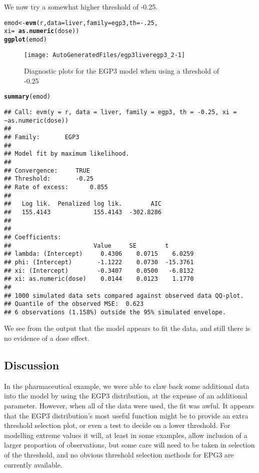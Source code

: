 \documentclass[a4paper]{article}\usepackage[]{graphicx}\usepackage[]{color}
\makeatletter
\def\maxwidth{ %
  \ifdim\Gin@nat@width>\linewidth
    \linewidth
  \else
    \Gin@nat@width
  \fi
}
\newcommand{\hlnum}[1]{\textcolor[rgb]{0.686,0.059,0.569}{#1}}%
\newcommand{\hlopt}[1]{\textcolor[rgb]{0,0,0}{#1}}%
\newcommand{\hlstd}[1]{\textcolor[rgb]{0.345,0.345,0.345}{#1}}%
\newcommand{\hlkwb}[1]{\textcolor[rgb]{0.69,0.353,0.396}{#1}}%
\newcommand{\hlkwc}[1]{\textcolor[rgb]{0.333,0.667,0.333}{#1}}%
\newcommand{\hlkwd}[1]{\textcolor[rgb]{0.737,0.353,0.396}{\textbf{#1}}}%
\newenvironment{kframe}{%
 \def\at@end@of@kframe{}%
 \ifinner\ifhmode%
  \def\at@end@of@kframe{\end{minipage}}%
  \begin{minipage}{\columnwidth}%
 \fi\fi%
 \def\FrameCommand##1{\hskip\@totalleftmargin \hskip-\fboxsep
 \colorbox{shadecolor}{##1}\hskip-\fboxsep
     \hskip-\linewidth \hskip-\@totalleftmargin \hskip\columnwidth}%
 \MakeFramed {\advance\hsize-\width
   \@totalleftmargin\z@ \linewidth\hsize
   \@setminipage}}%
 {\par\unskip\endMakeFramed%
 \at@end@of@kframe}
\newenvironment{knitrout}{}{} %
\makeatother
\begin{document}
We now try a somewhat higher threshold of -0.25.
\begin{knitrout}
\color{fgcolor}\begin{kframe}
\begin{alltt}
\hlstd{emod} \hlkwb{<-} \hlkwd{evm}\hlstd{(r,} \hlkwc{data}\hlstd{=liver,} \hlkwc{family}\hlstd{=egp3,} \hlkwc{th}\hlstd{=}\hlopt{-}\hlnum{.25}\hlstd{,}
            \hlkwc{xi}\hlstd{=}\hlopt{~}\hlkwd{as.numeric}\hlstd{(dose))}
\hlkwd{ggplot}\hlstd{(emod)}
\end{alltt}
\end{kframe}\begin{figure}
\texttt{[image: AutoGeneratedFiles/egp3liveregp3\_2-1]} \caption[Diagnostic plots for the EGP3 model when using a threshold of -0.25]{Diagnostic plots for the EGP3 model when using a threshold of -0.25}\label{fig:liveregp3_2}
\end{figure}

\begin{kframe}\begin{alltt}
\hlkwd{summary}\hlstd{(emod)}
\end{alltt}
\begin{verbatim}
## Call: evm(y = r, data = liver, family = egp3, th = -0.25, xi = ~as.numeric(dose))
## 
## Family:       EGP3 
## 
## Model fit by maximum likelihood.
## 
## Convergence:		TRUE
## Threshold:		-0.25
## Rate of excess:		0.855
## 
##   Log lik.  Penalized log lik.        AIC
##   155.4143            155.4143  -302.8286
## 
## 
## Coefficients:
##                       Value     SE        t       
## lambda: (Intercept)     0.4306    0.0715    6.0259
## phi: (Intercept)       -1.1222    0.0730  -15.3761
## xi: (Intercept)        -0.3407    0.0500   -6.8132
## xi: as.numeric(dose)    0.0144    0.0123    1.1770
## 
## 1000 simulated data sets compared against observed data QQ-plot.
## Quantile of the observed MSE:  0.623 
## 6 observations (1.158%) outside the 95% simulated envelope.
\end{verbatim}
\end{kframe}
\end{knitrout}

We see from the output that the model appears to fit the data, and still there
is no evidence of a dose effect.

\subsection{Discussion}
In the pharmaceutical example, we were able to claw back some additional data into
the model by using the EGP3 distribution, at the expense of an additional
parameter. However, when all of the data were used, the fit was awful. It appears
that the EGP3 distribution's most useful function might be to provide an extra
threshold selection plot, or even a test to decide on a lower threshold. For
modelling extreme values it will, at least in some examples, allow inclusion of
a larger proportion of observations, but some care will need to be taken in
selection of the threshold, and no obvious threshold selection methods for EPG3
are currently available.
\end{document}

